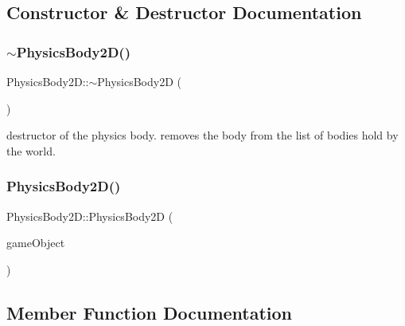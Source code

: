 \subsection{Constructor \& Destructor Documentation}
\hypertarget{class_mason_1_1_physics_body2_d_a9cd23100f41c0ae3dbce853e88f804e1}{}\label{class_mason_1_1_physics_body2_d_a9cd23100f41c0ae3dbce853e88f804e1} 
\subsubsection{\texorpdfstring{$\sim$\+Physics\+Body2\+D()}{~PhysicsBody2D()}}
{\footnotesize\ttfamily Physics\+Body2\+D\+::$\sim$\+Physics\+Body2D (\begin{DoxyParamCaption}{ }\end{DoxyParamCaption})}



destructor of the physics body. removes the body from the list of bodies hold by the world. 

\hypertarget{class_mason_1_1_physics_body2_d_a70f168ce81ef424d8c7eac3f199f9c2b}{}\label{class_mason_1_1_physics_body2_d_a70f168ce81ef424d8c7eac3f199f9c2b} 
\subsubsection{\texorpdfstring{Physics\+Body2\+D()}{PhysicsBody2D()}}
{\footnotesize\ttfamily Physics\+Body2\+D\+::\+Physics\+Body2D (\begin{DoxyParamCaption}\item[{std\+::shared\+\_\+ptr$<$ \hyperlink{class_mason_1_1_game_object}{Game\+Object} $>$}]{game\+Object }\end{DoxyParamCaption})\hspace{0.3cm}{\ttfamily [protected]}}



\subsection{Member Function Documentation}
\hypertarget{class_mason_1_1_physics_body2_d_adabfbe103ece98e01024752ef939158d}{}\label{class_mason_1_1_physics_body2_d_adabfbe103ece98e01024752ef939158d} 
